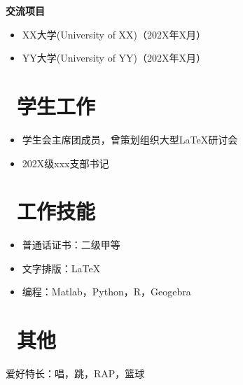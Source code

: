 \documentclass[11pt]{article}
\begin{document}
\textbf{交流项目}
\begin{itemize}
	\item XX大学(University of XX)（202X年X月）
	\item YY大学(University of YY)（202X年X月）
\end{itemize}

%
%

\section{\makebox[\widthof{\faGraduationCap}][c]{\color{CVBlue}\faUsers}\ 学生工作}
\begin{itemize}
	\item 学生会主席团成员，曾策划组织大型\LaTeX{}研讨会
	\item 202X级xxx支部书记
\end{itemize}

\section{\makebox[\widthof{\faGraduationCap}][c]{\color{CVBlue}\faWrench}\ 工作技能}

\begin{itemize}
	
	\item 普通话证书：二级甲等
	\item 文字排版：\LaTeX{}
	\item 编程：Matlab，Python，R，Geogebra

\end{itemize}

\section{\makebox[\widthof{\faGraduationCap}][c]{\color{CVBlue}\faTags}\ 其他}
爱好特长：唱，跳，RAP，篮球

\end{document}

